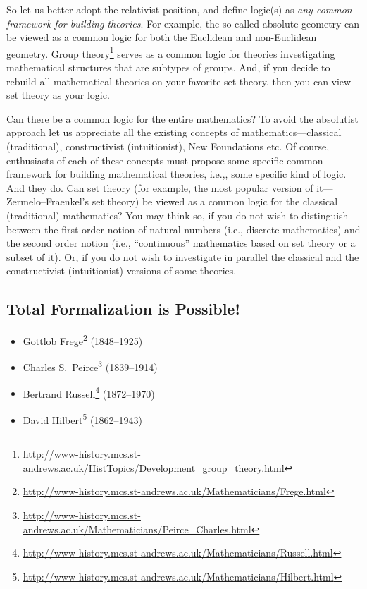 So let us better adopt the relativist position, and define logic(s) as \emph{any common framework for building theories}.
For example, the so-called absolute geometry can be viewed as a common logic for both the Euclidean and non-Euclidean geometry.
Group theory\footnote{\url{http://www-history.mcs.st-andrews.ac.uk/HistTopics/Development\_group\_theory.html}} serves as a common logic for theories investigating mathematical structures that are subtypes of groups.
And, if you decide to rebuild all mathematical theories on your favorite set theory, then you can view set theory as your logic.

Can there be a common logic for the entire mathematics?
To avoid the absolutist approach let us appreciate all the existing concepts of mathematics---classical (traditional), constructivist (intuitionist), New Foundations etc.
Of course, enthusiasts of
each of these concepts must propose some specific common framework for building mathematical theories, i.e.,, some specific kind of logic.
And they do.
Can set theory (for example, the most popular version of it---Zermelo--Fraenkel's set theory) be viewed as a common logic for the classical (traditional) mathematics?
You may think so, if you do not wish to distinguish between the first-order notion of natural numbers (i.e., discrete mathematics) and the second order notion (i.e., ``continuous'' mathematics based on set theory or a subset of it).
Or, if you do not wish to investigate in parallel the classical and the constructivist (intuitionist) versions of some theories.

\subsection{Total Formalization is Possible!}
\begin{itemize}
    \item Gottlob Frege\footnote{\url{http://www-history.mcs.st-andrews.ac.uk/Mathematicians/Frege.html}} (1848--1925)
    \item Charles S.\ Peirce\footnote{\url{http://www-history.mcs.st-andrews.ac.uk/Mathematicians/Peirce\_Charles.html}} (1839--1914)
    \item Bertrand Russell\footnote{\url{http://www-history.mcs.st-andrews.ac.uk/Mathematicians/Russell.html}} (1872--1970)
    \item David Hilbert\footnote{\url{http://www-history.mcs.st-andrews.ac.uk/Mathematicians/Hilbert.html}} (1862--1943)
\end{itemize}

